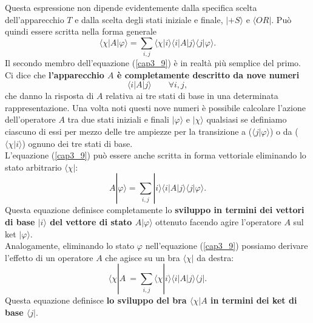 Questa espressione non dipende evidentemente dalla specifica scelta dell'apparecchio $T$ e dalla scelta degli stati iniziale e finale, $| +S \rangle $ e $\langle OR |$. Può quindi essere scritta nella forma generale
	\begin{equation}
		\boxed{\boxed{
			\langle \chi | A | \varphi \rangle = \sum \limits_{i,j} \langle \chi | i \rangle \langle i | A | j \rangle \langle j | \varphi \rangle .
			}}
	\label{cap3_9}
	\end{equation}
Il secondo membro dell'equazione (\ref{cap3_9}) è in realtà più semplice del primo. Ci dice che \textbf{l'apparecchio $A$ è completamente descritto da nove numeri}
	\begin{equation}
		\boxed{
			\langle i | A | j \rangle  \qquad \forall i,j ,
			}
	\end{equation}
che danno la risposta di $A$ relativa ai tre stati di base in una determinata rappresentazione. Una volta noti questi nove numeri è possibile calcolare l'azione dell'operatore $A$ tra due stati iniziali e finali $| \varphi \rangle $ e $| \chi \rangle$ qualsiasi se definiamo ciascuno di essi per mezzo delle tre ampiezze per la transizione a ($\langle j | \varphi \rangle $) o da ($\langle \chi | i \rangle$) ognuno dei tre stati di base.\\

L'equazione (\ref{cap3_9}) può essere anche scritta in forma vettoriale eliminando lo stato arbitrario $\langle \chi | $:
	\begin{equation}
		\boxed{
			A| \varphi \rangle = \sum \limits_{i,j}  |i \rangle \langle i | A | j \rangle \langle j | \varphi \rangle .
			}
	\label{cap3_10}
	\end{equation}
Questa equazione definisce completamente lo \textbf{sviluppo in termini dei vettori di base $ | i \rangle$ del vettore di stato $A | \varphi \rangle $} ottenuto facendo agire l'operatore $A$ sul ket $ | \varphi \rangle$.\\

Analogamente, eliminando lo stato $\varphi$ nell'equazione (\ref{cap3_9}) possiamo derivare l'effetto di un operatore $A$ che agisce su un bra $ \langle \chi |$ da destra:
	\begin{equation}
		\boxed{
			\langle \chi | A\ = \sum \limits_{i,j} \langle \chi | i \rangle \langle i | A  | j \rangle \langle j | .
			}	
	\label{cap3_11}
	\end{equation}
Questa equazione definisce \textbf{lo sviluppo del bra $\langle \chi |A$ in termini dei ket di base $\langle j |$}.

